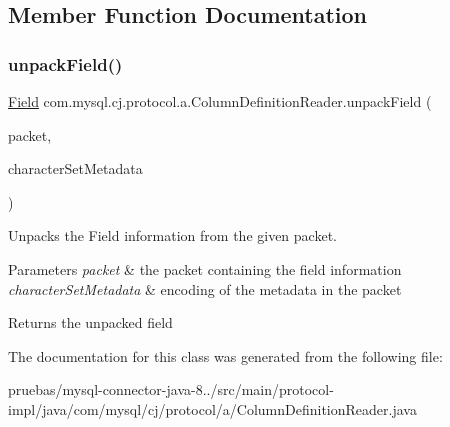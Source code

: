 \subsection{Member Function Documentation}
\mbox{\label{classcom_1_1mysql_1_1cj_1_1protocol_1_1a_1_1_column_definition_reader_a544a33df60bf2153e61c6c743e3aefd7}} 
\subsubsection{\texorpdfstring{unpack\+Field()}{unpackField()}}
{\footnotesize\ttfamily \mbox{\hyperlink{classcom_1_1mysql_1_1cj_1_1result_1_1_field}{Field}} com.\+mysql.\+cj.\+protocol.\+a.\+Column\+Definition\+Reader.\+unpack\+Field (\begin{DoxyParamCaption}\item[{\mbox{\hyperlink{classcom_1_1mysql_1_1cj_1_1protocol_1_1a_1_1_native_packet_payload}{Native\+Packet\+Payload}}}]{packet,  }\item[{String}]{character\+Set\+Metadata }\end{DoxyParamCaption})\hspace{0.3cm}{\ttfamily [protected]}}

Unpacks the Field information from the given packet.


\begin{DoxyParams}{Parameters}
{\em packet} & the packet containing the field information \\
\hline
{\em character\+Set\+Metadata} & encoding of the metadata in the packet\\
\hline
\end{DoxyParams}
\begin{DoxyReturn}{Returns}
the unpacked field 
\end{DoxyReturn}


The documentation for this class was generated from the following file\+:\begin{DoxyCompactItemize}
\item 
pruebas/mysql-\/connector-\/java-\/8../src/main/protocol-\/impl/java/com/mysql/cj/protocol/a/Column\+Definition\+Reader.\+java\end{DoxyCompactItemize}
